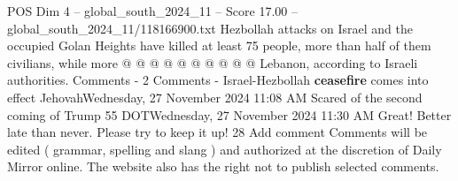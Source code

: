 \begin{textsample}{POS Dim 4 – global\_south\_2024\_11 – Score 17.00 – global\_south\_2024\_11/118166900.txt}
Hezbollah attacks on Israel and the occupied Golan Heights have killed at least 75 people, more than half of them civilians, while more @ @ @ @ @ @ @ @ @ @ Lebanon, according to Israeli authorities.
Comments - 2 Comments - Israel-Hezbollah \textbf{ceasefire} comes into effect JehovahWednesday, 27 November 2024 11:08 AM Scared of the second coming of Trump 55 DOTWednesday, 27 November 2024 11:30 AM Great!
Better late than never.
Please try to keep it up! 28 Add comment Comments will be edited ( grammar, spelling and slang ) and authorized at the discretion of Daily Mirror online.
The website also has the right not to publish selected comments.

\end{textsample}
